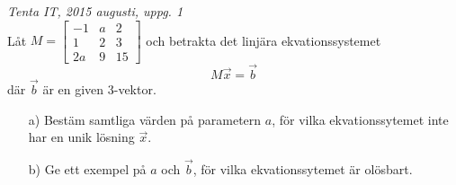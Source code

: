 {\it Tenta IT, 2015 augusti, uppg. 1}\\
Låt $M=\begin{bmatrix}-1&a&2\\1&2&3\\2a&9&15\end{bmatrix}$ och betrakta det linjära ekvationssystemet
$$M\vec{x}=\vec{b}$$
där $\vec{b}$ är en given 3-vektor.
\begin{itemize}
	\item[a) ] Bestäm samtliga värden på parametern $a$, för vilka ekvationssytemet inte har en unik lösning $\vec{x}$.
	\item[b) ] Ge ett exempel på $a$ och $\vec{b}$, för vilka ekvationssytemet är olösbart.
\end{itemize}